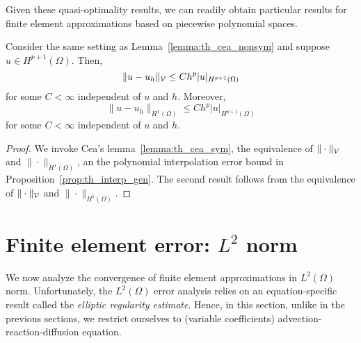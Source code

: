 Given these quasi-optimality results, we can readily obtain particular results for finite element approximations based on piecewise polynomial spaces.
\begin{proposition}
  Consider the same setting as Lemma~\ref{lemma:th_cea_nonsym} and suppose $u \in H^{p+1}(\Omega)$.  Then, 
  \begin{equation}
    \| u - u_h \|_{\mathcal{V}} \leq C h^{p} | u |_{H^{p+1}(\Omega)}
  \end{equation}
  for some $C < \infty$ independent of $u$ and $h$. Moreover,
  \begin{equation}
    \| u - u_h \|_{H^1(\Omega)} \leq C h^{p} | u |_{H^{p+1}(\Omega)}
  \end{equation}
  for some $C < \infty$ independent of $u$ and $h$.
  \begin{proof}
    We invoke Cea's lemma~\ref{lemma:th_cea_sym}, the equivalence of $\| \cdot \|_{\mathcal{V}}$ and $\| \cdot \|_{H^1(\Omega)}$, an the polynomial interpolation error bound in Proposition~\ref{prop:th_interp_gen}.
    The second result follows from the equivalence of $\| \cdot \|_{\mathcal{V}}$ and $\| \cdot \|_{H^1(\Omega)}$.
  \end{proof}
\end{proposition}



\section{Finite element error: $L^2$ norm}
We now analyze the convergence of finite element approximations in $L^2(\Omega)$ norm.  Unfortunately, the $L^2(\Omega)$ error analysis relies on an equation-specific result called the \emph{elliptic regularity estimate}.  Hence, in this section, unlike in the previous sections, we restrict ourselves to (variable coefficients) advection-reaction-diffusion equation.

